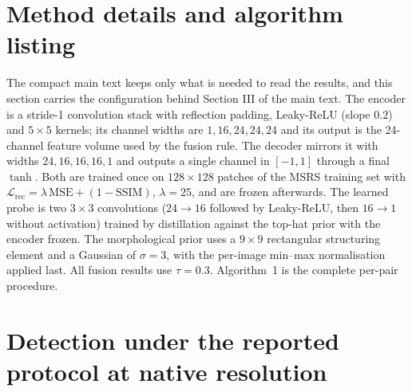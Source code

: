 \documentclass[11pt,a4paper]{article}
\begin{document}
\section{Method details and algorithm listing}
\label{sec:lmethod}

The compact main text keeps only what is needed to read the results, and this section
carries the configuration behind Section III of the main text. The encoder is a stride-1
convolution stack with reflection padding, Leaky-ReLU (slope $0.2$) and $5\times5$
kernels; its channel widths are $1,16,24,24,24$ and its output is the 24-channel
feature volume used by the fusion rule. The decoder mirrors it with widths
$24,16,16,16,1$ and outputs a single channel in $[-1,1]$ through a final $\tanh$. Both
are trained once on $128\times128$ patches of the MSRS training set with
$\mathcal{L}_{\mathrm{rec}}=\lambda\,\mathrm{MSE}+(1-\mathrm{SSIM})$, $\lambda=25$, and
are frozen afterwards. The learned probe is two $3\times3$ convolutions
($24\rightarrow16$ followed by Leaky-ReLU, then $16\rightarrow1$ without activation)
trained by distillation against the top-hat prior with the encoder frozen. The
morphological prior uses a $9\times9$ rectangular structuring element and a Gaussian of
$\sigma=3$, with the per-image min--max normalisation applied last. All fusion results
use $\tau=0.3$. Algorithm~1 is the complete per-pair procedure.

\begin{center}
\end{center}

\section{Detection under the reported protocol at native resolution}
\label{sec:lnative}
\end{document}
